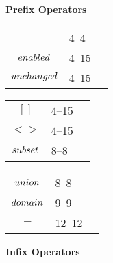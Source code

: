 \documentclass[fleqn,leqno]{article}
\begin{document}
\vspace{2\baselineskip}
{\centering

\textbf{Prefix Operators}
\vspace{.2\baselineskip}

\begin{tabular}[t]{@{}cl@{\,}l@{}}
$~$ & 4--4 \\
$\ENABLED$ & 4--15 \\
$\UNCHANGED$ & 4--15 \\
\end{tabular}%
%
\begin{tabular}[t]{@{}cl@{\,}l@{}}
$[]$ & 4--15 \\
$<>$ & 4--15 \\
$\SUBSET$ & 8--8 \\
\end{tabular}%
%
\begin{tabular}[t]{@{}cl@{\,}l@{}}
$\UNION$ & 8--8 \\
$\DOMAIN$ & 9--9\\
$-$ & 12--12 \\
\end{tabular}%


\vspace{1.8\baselineskip}

\textbf{Infix Operators}
\vspace{.2\baselineskip}

}
\end{document}
